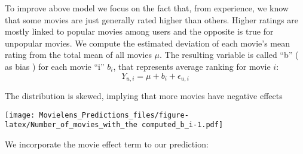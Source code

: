 \documentclass[
]{article}
\newenvironment{Shaded}{\begin{snugshade}}{\end{snugshade}}
\newcommand{\CommentTok}[1]{\textcolor[rgb]{0.00,0.40,1.00}{\textbf{\textit{#1}}}}
\newcommand{\DataTypeTok}[1]{\textcolor[rgb]{0.74,0.68,0.62}{\underline{#1}}}
\newcommand{\DecValTok}[1]{\textcolor[rgb]{0.27,0.67,0.26}{#1}}
\newcommand{\KeywordTok}[1]{\textcolor[rgb]{0.26,0.66,0.93}{\textbf{#1}}}
\newcommand{\NormalTok}[1]{\textcolor[rgb]{0.74,0.68,0.62}{#1}}
\newcommand{\OperatorTok}[1]{\textcolor[rgb]{0.74,0.68,0.62}{#1}}
\newcommand{\StringTok}[1]{\textcolor[rgb]{0.02,0.61,0.04}{#1}}
\begin{document}
To improve above model we focus on the fact that, from experience, we
know that some movies are just generally rated higher than others.
Higher ratings are mostly linked to popular movies among users and the
opposite is true for unpopular movies. We compute the estimated
deviation of each movie's mean rating from the total mean of all movies
\(\mu\). The resulting variable is called ``b'' ( as bias ) for each
movie ``i'' \(b_{i}\), that represents average ranking for movie \(i\):
\[Y_{u, i} = \mu +b_{i}+ \epsilon_{u, i}\]

The distribution is skewed, implying that more movies have negative
effects

\begin{Shaded}
\end{Shaded}

\texttt{[image: Movielens\_Predictions\_files/figure-latex/Number\_of\_movies\_with\_the computed\_b\_i-1.pdf]}

We incorporate the movie effect term to our prediction:
\end{document}
